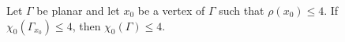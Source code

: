 Let $\Gamma$ be planar and let $x_0$ be a vertex of $\Gamma$ such that $\rho(x_0) \leq 4$. If $\chi_0(\Gamma_{x_0}) \leq 4$, then $\chi_0(\Gamma) \leq 4$.
